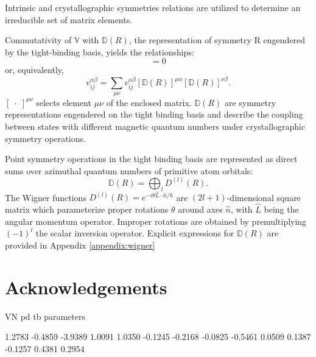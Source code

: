 \documentclass[twocolumn,showpacs,preprintnumbers,superscriptaddress,prb,floatfix,aps,10pt]{revtex4-1}
\newcommand*{\wignerD}{\mathbb{D}(R)}
\newcommand*{\wignerDl}{D^{(l)}(R)}
\begin{document}
Intrinsic and crystallographic symmetries relations are utilized to determine an irreducible set of matrix elements. 

Commutativity of $\mathbb{V}$ with $\wignerD$, the representation of symmetry R engendered by the tight-binding basis, yields the relationships:
\begin{equation}
[\mathbb{V},\wignerD] = 0
\end{equation}
or, equivalently,
\begin{equation}
\label{eq:stab}
v_{ij}^{\alpha\beta} = \sum_{\mu\nu} v_{ij}^{\alpha\beta} \left[\wignerD\right]^{\mu\alpha} \left[\wignerD\right]^{\nu\beta}.
\end{equation}
$\left[\phantom{.}\cdot\phantom{.}\right] ^{\mu\nu}$ selects element $\mu\nu$ of the enclosed matrix. $\wignerD$ are symmetry representations engendered on the tight binding basis and describe the coupling between states with different magnetic quantum numbers under crystallographic symmetry operations. 

Point symmetry operations in the tight binding basis are represented as direct sums over azimuthal quantum numbers of primitive atom orbitals:
\begin{equation}
\wignerD = \bigoplus_l \wignerDl.
\end{equation}
The Wigner functions $\wignerDl =  e^{-i\theta\hat{L}\cdot\hat{n}/\hbar}$ are $(2l+1)$-dimensional square matrix which parameterize proper rotations $\theta$ around axes $\hat{n}$, with $\hat{L}$ being the angular momentum operator. %
Improper rotations are obtained by premultiplying $(-1)^l$ the scalar inversion operator. \cite{sharma_general_1979,el-batanouny_symmetry_2008} %
Explicit expressions for $\wignerD$ are provided in Appendix \ref{appendix:wigner}




\section{Acknowledgements}



\clearpage

VN pd tb parameters

    1.2783
   -0.4859
   -3.9389
    1.0091
    1.0350
   -0.1245
   -0.2168
   -0.0825
   -0.5461
    0.0509
    0.1387
   -0.1257
    0.4381
    0.2954




\appendix
\end{document}
